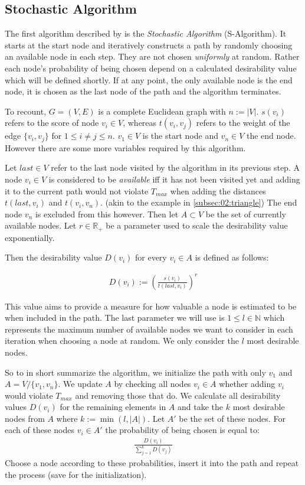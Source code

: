 \subsection{Stochastic Algorithm}
\label{subsec:03:salgo}

The first algorithm described by \citeauthor{tsiligiridis_heuristic_1984} is the \emph{Stochastic Algorithm} (S-Algorithm).
It starts at the start node and iteratively constructs a path by randomly choosing an available node in each step.
They are not chosen \emph{uniformly} at random. Rather each node's probability of being chosen depend on a calculated desirability value which will be defined shortly.
If at any point, the only available node is the end node, it is chosen as the last node of the path and the algorithm terminates.

To recount, $G = (V, E)$ is a complete Euclidean graph with $n := |V|$.
$s(v_i)$ refers to the score of node $v_i \in V$, whereas $t(v_i,v_j)$ refers to the weight of the edge $\{v_i, v_j\}$ for $1 \leq i \neq j \leq n$.
$v_1 \in V$ is the start node and $v_n \in V$ the end node.
However there are some more variables required by this algorithm.

Let $last \in V$ refer to the last node visited by the algorithm in its previous step.
A node $v_i \in V$ is considered to be \emph{available} iff it has not been visited yet and adding it to the current path would not violate $T_{max}$ when adding the distances $t(last, v_i)$ and $t(v_i, v_n)$. (akin to the example in \cref{subsec:02:triangle}) 
The end node $v_n$ is excluded from this however.
Then let $A \subset V$ be the set of currently available nodes. 
Let $r \in \mathbb{R}_+$ be a parameter used to scale the desirability value exponentially.

Then the desirability value $D(v_i)$ for every $v_i \in A$ is defined as follows:

\begin{align*}
    D(v_i) := \left( \frac{s(v_i)}{t(last, v_i)} \right)^r
\end{align*}

This value aims to provide a measure for how valuable a node is estimated to be when included in the path.
The last parameter we will use is $1 \leq l \in \mathbb{N}$ which represents the maximum number of available nodes we want to consider in each iteration when choosing a node at random.
We only consider the $l$ most desirable nodes.

So to in short summarize the algorithm, we initialize the path with only $v_1$ and $A = V / \{v_1, v_n\}$.
We update $A$ by checking all nodes $v_i \in A$ whether adding $v_i$ would violate $T_{max}$ and removing those that do. 
We calculate all desirability values $D(v_i)$ for the remaining elements in $A$ and take the $k$ most desirable nodes from $A$ where $k := \min(l, |A|)$. Let $A'$ be the set of these nodes.
For each of these nodes $v_i \in A'$ the probability of being chosen is equal to:
\begin{align*}
    \frac{D(v_i)}{\sum_{j=1}^k D(v_j)}
\end{align*}
Choose a node according to these probabilities, insert it into the path and repeat the process (save for the initialization).

